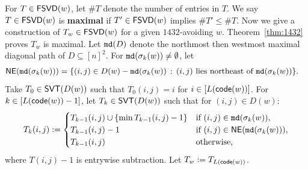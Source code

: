 \documentclass[12pt]{amsart}
\theoremstyle{definition}
\theoremstyle{remark}
\numberwithin{equation}{section}
\newcommand \mdCR[1]{{\tt md}(#1)}
\newcommand{\code}{{\sf code}}
\newcommand\mydef[1]{{\bf #1}}
\newcommand{\FSVD}{{\sf FSVD}}
\newcommand{\SVT}{{\sf SVT}}
\newcommand{\NE}{{\sf NE}}
\begin{document}
For $T\in \FSVD(w)$, let 
$\#T$ denote the number of entries in $T$. 
 We say $T\in \FSVD(w)$ is \mydef{maximal} if $T'\in \FSVD(w)$ implies $\#T'\leq\#T$.
Now we give a construction of $T_w\in \FSVD(w)$ for a given $1432$-avoiding $w$. Theorem~\ref{thm:1432} proves $T_w$ is maximal. Let $\mdCR{D}$ denote the northmost then westmost maximal diagonal path of $D\subseteq [n]^2$.
For $\mdCR{\sigma_k(w)}\neq \emptyset$, let 
 \begin{align*}
 \NE(\mdCR{\sigma_k(w)})&=\{(i,j)\in D(w)- \mdCR{\sigma_k(w)} \,:  \, (i,j) \text{ lies northeast of } \mdCR{\sigma_k(w)} \}.
\end{align*}
Take $T_0\in \SVT(D(w))$ such that $T_0(i,j)=i$ for $i\in [L(\code(w))]$. 
For $k\in [L(\code(w))-1]$, 
let $T_k\in \SVT(D(w))$ such that for $(i,j)\in D(w)$:
  \[T_k(i,j):=\begin{cases}
    T_{k-1}(i,j)\cup \{\min{T_{k-1}(i,j)}-1\} &\text{if } (i,j)\in \mdCR{\sigma_k(w)},\\
	T_{k-1}(i,j)-1 &\mbox{if }  (i,j)\in \NE(\mdCR{\sigma_k(w)}),\\
		T_{k-1}(i,j) &\text{otherwise,}
	\end{cases}\]
where $T(i,j)-1$ is entrywise subtraction. Let $T_w:=T_{L(\code(w))}$.
\end{document}

